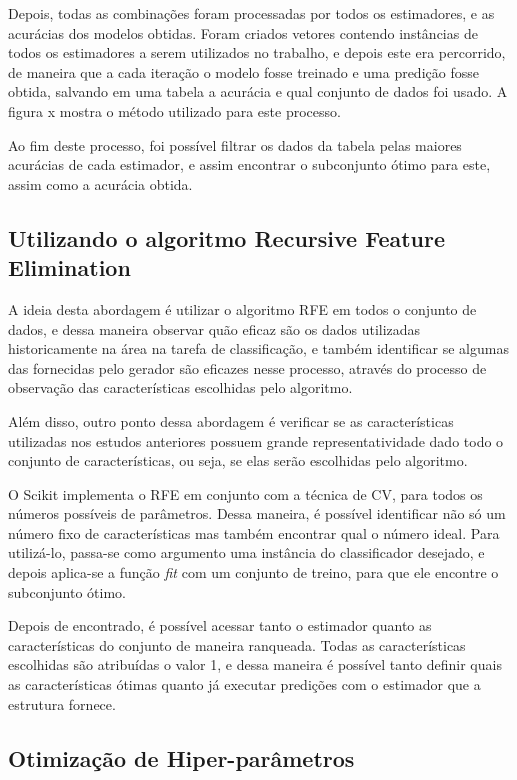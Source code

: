 Depois, todas as combinações foram processadas por todos os estimadores, e as acurácias dos modelos obtidas. Foram criados vetores contendo instâncias de todos os estimadores a serem utilizados no trabalho, e depois este era percorrido, de maneira que a cada iteração o modelo fosse treinado e uma predição fosse obtida, salvando em uma tabela a acurácia e qual conjunto de dados foi usado. A figura x mostra o método utilizado para este processo. 

Ao fim deste processo, foi possível filtrar os dados da tabela pelas maiores acurácias de cada estimador, e assim encontrar o subconjunto ótimo para este, assim como a acurácia obtida.

\subsection{Utilizando o algoritmo Recursive Feature Elimination}
\label{ss.dados-rfe}

A ideia desta abordagem é utilizar o algoritmo RFE em todos o conjunto de dados, e dessa maneira observar quão eficaz são os dados utilizadas historicamente na área na tarefa de classificação, e também identificar se algumas das fornecidas pelo gerador são eficazes nesse processo, através do processo de observação das características escolhidas pelo algoritmo. 

Além disso, outro ponto dessa abordagem é verificar se as características utilizadas nos estudos anteriores possuem grande representatividade dado todo o conjunto de características, ou seja, se elas serão escolhidas pelo algoritmo.

O Scikit implementa o RFE em conjunto com a técnica de CV, para todos os números possíveis de parâmetros. Dessa maneira, é possível identificar não só um número fixo de características mas também encontrar qual o número ideal. Para utilizá-lo, passa-se como argumento uma instância do classificador desejado, e depois aplica-se a função \textit{fit} com um conjunto de treino, para que ele encontre o subconjunto ótimo.

Depois de encontrado, é possível acessar tanto o estimador quanto as características do conjunto de maneira ranqueada. Todas as características escolhidas são atribuídas o valor 1, e dessa maneira é possível tanto definir quais as características ótimas quanto já executar predições com o estimador que a estrutura fornece.  

\subsection{Otimização de Hiper-parâmetros}

